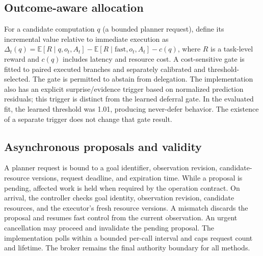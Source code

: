 \documentclass[11pt]{article}
\begin{document}
\subsection{Outcome-aware allocation}
For a candidate computation $q$ (a bounded planner request), define its incremental value relative to immediate execution as $\Delta_t(q)=\mathbb{E}[R\mid q,o_t,A_t]-\mathbb{E}[R\mid \text{fast},o_t,A_t]-c(q)$, where $R$ is a task-level reward and $c(q)$ includes latency and resource cost. A cost-sensitive gate is fitted to paired executed branches and separately calibrated and threshold-selected. The gate is permitted to abstain from delegation. The implementation also has an explicit surprise/evidence trigger based on normalized prediction residuals; this trigger is distinct from the learned deferral gate. In the evaluated fit, the learned threshold was 1.01, producing never-defer behavior. The existence of a separate trigger does not change that gate result.

\subsection{Asynchronous proposals and validity}
A planner request is bound to a goal identifier, observation revision, candidate-resource versions, request deadline, and expiration time. While a proposal is pending, affected work is held when required by the operation contract. On arrival, the controller checks goal identity, observation revision, candidate resources, and the executor's fresh resource versions. A mismatch discards the proposal and resumes fast control from the current observation. An urgent cancellation may proceed and invalidate the pending proposal. The implementation polls within a bounded per-call interval and caps request count and lifetime. The broker remains the final authority boundary for all methods.
\end{document}
